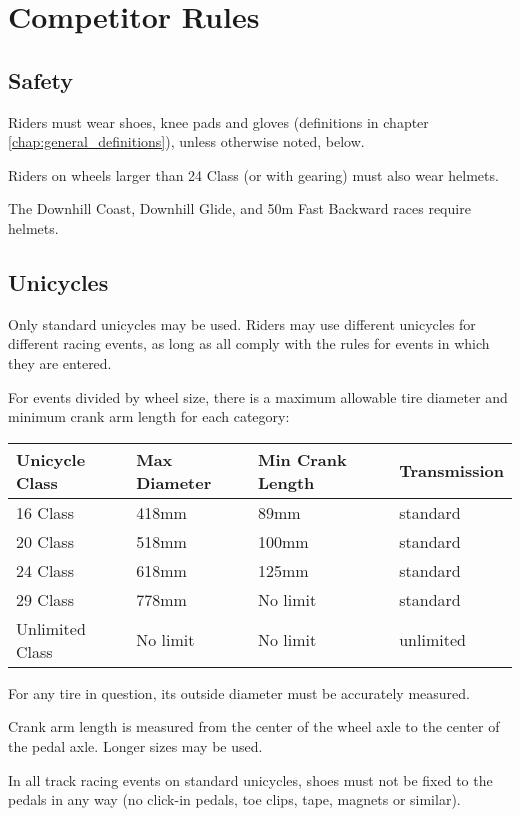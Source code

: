 \chapter{Competitor Rules}

\section{Safety}

Riders must wear shoes, knee pads and gloves (definitions in chapter \ref{chap:general_definitions}), unless otherwise noted, below.

Riders on wheels larger than 24 Class (or with gearing) must also wear helmets.

The Downhill Coast, Downhill Glide, and 50m Fast Backward races require helmets.

\section{Unicycles}

Only standard unicycles may be used.
Riders may use different unicycles for different racing events, as long as all comply with the rules for events in which they are entered.

For events divided by wheel size, there is a maximum allowable tire diameter and minimum crank arm length for each category:

\begin{longtable}{|p{3cm}|p{3cm}|p{4cm}|p{3cm}|}
\hline
\textbf{Unicycle Class} & \textbf{Max Diameter} & \textbf{Min Crank Length} & \textbf{Transmission}\\
\hline
16 Class & 418mm & 89mm & standard \\
\hline
20 Class & 518mm & 100mm & standard \\
\hline
24 Class & 618mm & 125mm & standard \\
\hline
29 Class & 778mm & No limit & standard \\
\hline
Unlimited Class & No limit & No limit & unlimited \\
\hline
\end{longtable}

For any tire in question, its outside diameter must be accurately measured.

Crank arm length is measured from the center of the wheel axle to the center of the pedal axle.
Longer sizes may be used.

In all track racing events on standard unicycles, shoes must not be fixed to the pedals in any way (no click-in pedals, toe clips, tape, magnets or similar).


